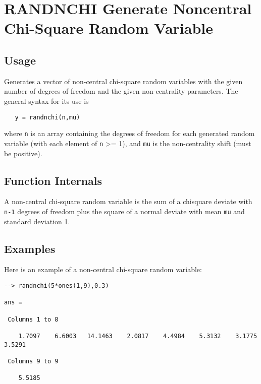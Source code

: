 \section{RANDNCHI Generate Noncentral Chi-Square Random Variable}

\subsection{Usage}

Generates a vector of non-central chi-square random variables
with the given number of degrees of freedom and the given
non-centrality parameters.  The general syntax for its use is
\begin{verbatim}
   y = randnchi(n,mu)
\end{verbatim}
where \verb|n| is an array containing the degrees of freedom for
each generated random variable (with each element of \verb|n| >= 1),
and \verb|mu| is the non-centrality shift (must be positive).
\subsection{Function Internals}

A non-central chi-square random variable is the sum of a chisquare
deviate with \verb|n-1| degrees of freedom plus the square of a normal
deviate with mean \verb|mu| and standard deviation 1.
\subsection{Examples}

Here is an example of a non-central chi-square random variable:
\begin{verbatim}
--> randnchi(5*ones(1,9),0.3)

ans = 

 Columns 1 to 8

    1.7097    6.6003   14.1463    2.0817    4.4984    5.3132    3.1775    3.5291 

 Columns 9 to 9

    5.5185 
\end{verbatim}
